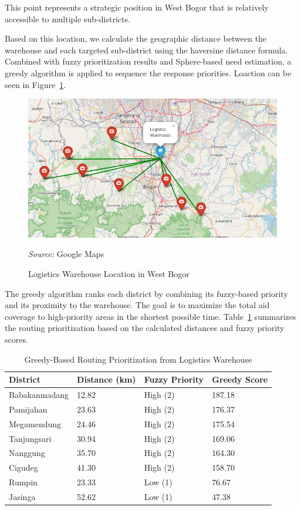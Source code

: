 \documentclass[journal,final,a4paper,twoside,11pt]{IEEEtran}
\begin{document}
This point represents a strategic position in West Bogor that is relatively accessible to multiple sub-districts.

Based on this location, we calculate the geographic distance between the warehouse and each targeted sub-district using the haversine distance formula. Combined with fuzzy prioritization results and Sphere-based need estimation, a greedy algorithm is applied to sequence the response priorities.
Loaction can be seen in Figure~\ref{fig:warehouse_location}.
\begin{figure}[H]
    \centerline{\includegraphics[width=0.8\linewidth]{fig6.png}}
    \caption{Logistics Warehouse Location in West Bogor}
    \label{fig:warehouse_location}
    \footnotesize{\textit{Source:} Google Maps}
\end{figure}


The greedy algorithm ranks each district by combining its fuzzy-based priority and its proximity to the warehouse. The goal is to maximize the total aid coverage to high-priority areas in the shortest possible time. Table~\ref{tab:greedy_routing} summarizes the routing prioritization based on the calculated distances and fuzzy priority scores. 

\begin{table}[H]
\caption{Greedy-Based Routing Prioritization from Logistics Warehouse}
\begin{center}
\begin{tabular}{|l|p{1cm}|p{2cm}|p{1cm}|}
\hline
\textbf{District} & \textbf{Distance (km)} & \textbf{Fuzzy Priority} & \textbf{Greedy Score} \\
\hline
Babakanmadang & 12.82 & High (2) & 187.18 \\
Pamijahan & 23.63 & High (2) & 176.37 \\
Megamendung & 24.46 & High (2) & 175.54 \\
Tanjungsari & 30.94 & High (2) & 169.06 \\
Nanggung & 35.70 & High (2) & 164.30 \\
Cigudeg & 41.30 & High (2) & 158.70 \\
Rumpin & 23.33 & Low (1) & 76.67 \\
Jasinga & 52.62 & Low (1) & 47.38 \\
\hline
\end{tabular}
\label{tab:greedy_routing}
\end{center}
\end{table}
\end{document}
